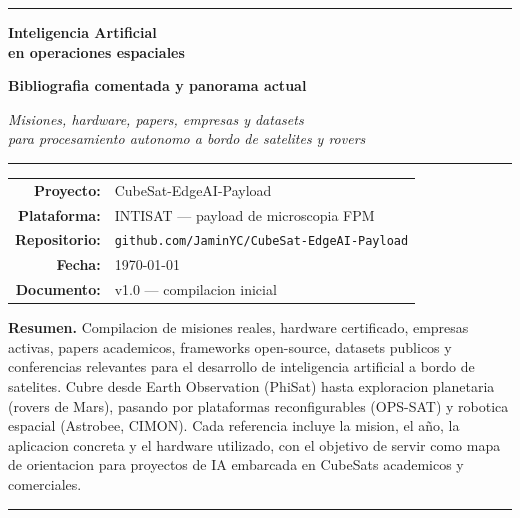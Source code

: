 \documentclass[11pt,a4paper,oneside]{report}
\begin{document}
\begin{titlepage}
\centering
\vspace*{1cm}
{\color{intisat}\rule{\textwidth}{2pt}}
\vspace{0.6cm}

{\Huge\bfseries\color{intisat} Inteligencia Artificial\\[0.2em]
en operaciones espaciales}

\vspace{0.4cm}
{\Large\bfseries Bibliografia comentada y panorama actual}

\vspace{0.7cm}
{\Large\itshape Misiones, hardware, papers, empresas y datasets\\
para procesamiento autonomo a bordo de satelites y rovers}

\vspace{1cm}
{\color{intisataccent}\rule{0.6\textwidth}{1pt}}

\vspace{2cm}

\begin{tabular}{rl}
\textbf{Proyecto:} & CubeSat-EdgeAI-Payload \\
\textbf{Plataforma:} & INTISAT --- payload de microscopia FPM \\
\textbf{Repositorio:} & \texttt{github.com/JaminYC/CubeSat-EdgeAI-Payload} \\
\textbf{Fecha:} & \today \\
\textbf{Documento:} & v1.0 --- compilacion inicial
\end{tabular}

\vfill

\begin{minipage}{0.85\textwidth}
\textbf{Resumen.}\quad
Compilacion de misiones reales, hardware certificado, empresas activas,
papers academicos, frameworks open-source, datasets publicos y conferencias
relevantes para el desarrollo de inteligencia artificial a bordo de
satelites. Cubre desde Earth Observation (PhiSat) hasta exploracion
planetaria (rovers de Mars), pasando por plataformas reconfigurables
(OPS-SAT) y robotica espacial (Astrobee, CIMON). Cada referencia incluye
la mision, el año, la aplicacion concreta y el hardware utilizado, con
el objetivo de servir como mapa de orientacion para proyectos de IA
embarcada en CubeSats academicos y comerciales.
\end{minipage}

\vspace{1.2cm}
{\color{intisat}\rule{\textwidth}{2pt}}
\end{titlepage}
\end{document}

